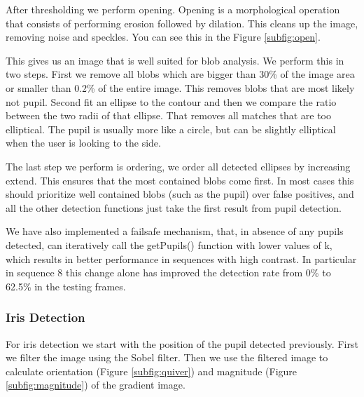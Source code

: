 After thresholding we perform opening.  Opening is a morphological operation that consists of performing erosion followed by dilation. This cleans up the image, removing noise and speckles. You can see this in the Figure \ref{subfig:open}.

This gives us an image that is well suited for blob analysis. We perform this in two steps. First we remove all blobs which are bigger than 30\% of the image area or smaller than 0.2\% of the entire image. This removes blobs that are most likely not pupil. Second fit an ellipse to the contour and then we compare the ratio between the two radii of that ellipse. That removes all matches that are too elliptical. The pupil is usually more like a circle, but can be slightly elliptical when the user is looking to the side.

The last step we perform is ordering, we order all detected ellipses by increasing extend. This ensures that the most contained blobs come first. In most cases this should prioritize well contained blobs (such as the pupil) over false positives, and all the other detection functions just take the first result from pupil detection.

We have also implemented a failsafe mechanism, that, in absence of any pupils detected, can iteratively call the getPupils() function with lower values of k, which results in better performance in sequences with high contrast. In particular in sequence 8 this change alone has improved the detection rate from 0\% to 62.5\% in the testing frames.

\subsubsection{Iris Detection}

For iris detection we start with the position of the pupil detected previously. First we filter the image using the Sobel filter. Then we use the filtered image to calculate orientation (Figure \ref{subfig:quiver}) and magnitude (Figure \ref{subfig:magnitude}) of the gradient image. 

